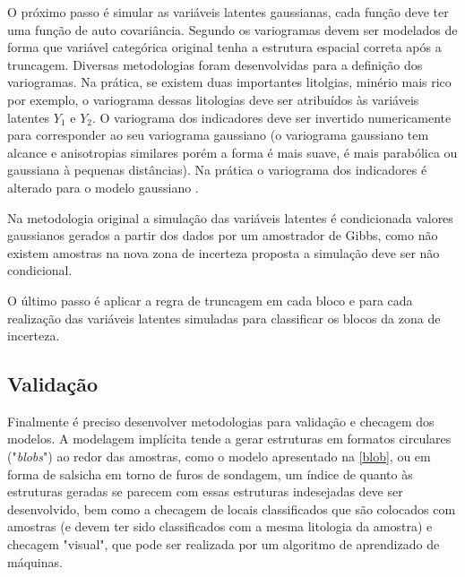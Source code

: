 O próximo passo é simular as variáveis latentes gaussianas, cada função deve ter uma função de auto covariância. Segundo  os variogramas devem ser modelados de forma que variável categórica original tenha a estrutura espacial correta após a truncagem. Diversas metodologias foram desenvolvidas para a definição dos variogramas. Na prática, se existem duas importantes litolgias, minério mais rico por exemplo, o variograma dessas litologias deve ser atribuídos às variáveis latentes $Y_1$ e $ Y_2$. O variograma dos indicadores deve ser invertido numericamente para corresponder ao seu variograma gaussiano \cite{journel2004evaluation} (o variograma gaussiano tem alcance e anisotropias similares  porém a forma é mais suave, é mais parabólica ou gaussiana à pequenas distâncias). Na prática o variograma dos indicadores é alterado para o modelo gaussiano \cite{pyrcz2014geostatistical}.

Na metodologia original \cite{armstrong2011plurigaussian} a simulação das variáveis latentes é condicionada valores gaussianos gerados a partir dos dados por um amostrador de Gibbs, como não existem amostras na nova zona de incerteza proposta a simulação deve ser não condicional.

O último passo é aplicar a regra de truncagem em cada bloco e para cada realização das variáveis latentes simuladas para classificar os blocos da zona de incerteza.

\subsection{Validação}

Finalmente é preciso desenvolver metodologias para validação e checagem dos modelos. A modelagem implícita tende a gerar estruturas em formatos circulares ("\textit{blobs}") ao redor das amostras, como o modelo apresentado na \autoref{blob}, ou em forma de salsicha em torno de furos de sondagem, um índice de quanto às estruturas geradas se parecem com essas estruturas indesejadas deve ser desenvolvido, bem como a checagem de locais classificados que são colocados com amostras (e devem ter sido classificados com a mesma litologia da amostra) e checagem "visual", que pode ser realizada por um algoritmo de aprendizado de máquinas.

